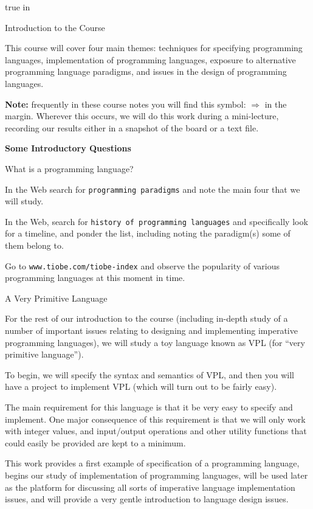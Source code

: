 


\advance {} true in


{\bigboldfont Introduction to the Course}
\medskip

This course will cover four main themes:  
techniques for specifying programming languages,
implementation of programming languages,
exposure to alternative programming language paradigms, and
issues in the design of programming languages.
\medskip

{\bf Note:}  frequently in these course notes you will find this symbol: $\Rightarrow$ in the
margin.  Wherever this occurs, we will do this work during a mini-lecture,
recording our results either in a snapshot of the board or a text file.
\bigskip

{\bf Some Introductory Questions}
\medskip

\doit What is a programming language?
\medskip

\doit
In the Web search for {\tt programming paradigms} and note the main four that
we will study.
\medskip

\doit
In the Web, search for {\tt history of programming languages} and specifically look for
a timeline, and ponder the list, including noting the paradigm(s) some of them belong to.
\medskip

\doit Go to {\tt www.tiobe.com/tiobe-index} and observe the popularity of various
programming languages at this moment in time.
\border

{\bigboldfont A Very Primitive Language}
\medskip

For the rest of our introduction to the course (including in-depth study of a number of important
issues relating to designing and implementing imperative programming languages), we will
study a toy language known as VPL (for ``very primitive language'').
\medskip

To begin, we will specify the syntax and semantics of VPL, and then
you will have a project to implement VPL (which will turn out to be fairly easy).
\medskip

The main requirement for this language is that it be very easy to specify and implement.
One major consequence of this requirement is that we will only work with integer values,
and input/output operations and other utility functions that could easily be provided are
kept to a minimum.
\medskip

This work provides a first example of specification of
a programming language,
begins our study of implementation of programming languages,
will be used later as the platform for discussing all sorts of imperative language
implementation issues, and will provide a very gentle introduction to language design
issues.
\medskip

